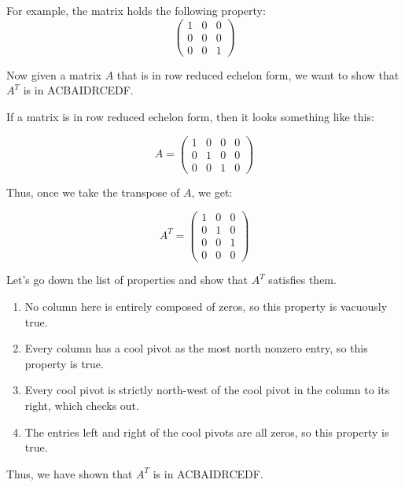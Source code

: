 \documentclass{report}
\begin{document}
{\begin{enumerate}[label=(\roman*)]
		      For example, the matrix holds the following property:
		      \[
			      \begin{pmatrix}
				      1 & 0 & 0 \\
				      0 & 0 & 0 \\
				      0 & 0 & 1
			      \end{pmatrix}
		      \]
	\end{enumerate}

	Now given a matrix \(A\) that is in row reduced echelon form, we want to show that \(A^{T}\) is in ACBAIDRCEDF.

	If a matrix is in row reduced echelon form, then it looks something like this:

	\[
		A = \begin{pmatrix}
			1 & 0 & 0 & 0 \\
			0 & 1 & 0 & 0 \\
			0 & 0 & 1 & 0
		\end{pmatrix}
	\]

	Thus, once we take the transpose of \(A\), we get:

	\[
		A^{T} = \begin{pmatrix}
			1 & 0 & 0 \\
			0 & 1 & 0 \\
			0 & 0 & 1 \\
			0 & 0 & 0
		\end{pmatrix}
	\]

	Let's go down the list of properties and show that \(A^{T}\) satisfies them.

	\begin{enumerate}[label=(\roman*), wide]
		\item No column here is entirely composed of zeros, so this property is vacuously true.
		\item Every column has a cool pivot as the most north nonzero entry, so this property is true.
		\item Every cool pivot is strictly north-west of the cool pivot in the column to its right, which checks out.
		\item The entries left and right of the cool pivots are all zeros, so this property is true.
	\end{enumerate}

	\parinf
	Thus, we have shown that \(A^{T}\) is in ACBAIDRCEDF.
}
\end{document}
